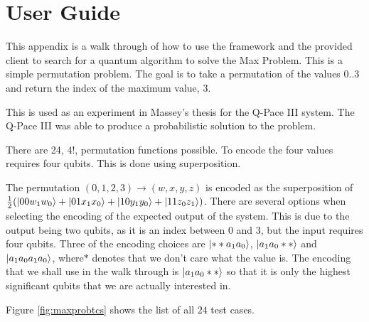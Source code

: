 \chapter{User Guide}
\label{sec:userguide}

This appendix is a walk through of how to use the framework and the provided client to search for a quantum algorithm to solve the Max Problem.
This is a simple permutation problem.
The goal is to take a permutation of the values $0..3$ and return the index of the maximum value, $3$.

This is used as an experiment in Massey's thesis\cite{masseythesis} for the Q-Pace III system.
The Q-Pace III was able to produce a probabilistic solution to the problem.

There are 24, $4!$, permutation functions possible.
To encode the four values requires four qubits.
This is done using superposition.

The permutation $(0,1,2,3)\rightarrow(w,x,y,z)$ is encoded as the superposition of $\frac{1}{2}(\left\vert{00w_1w_0}\right\rangle+\left\vert{01x_1x_0}\right\rangle+\left\vert{10y_1y_0}\right\rangle+\left\vert{11z_0z_1}\right\rangle)$.
There are several options when selecting the encoding of the expected output of the system.
This is due to the output being two qubits, as it is an index between $0$ and $3$, but the input requires four qubits.
Three of the encoding choices are $\left\vert{**a_1a_0}\right\rangle$, $\left\vert{a_1a_0**}\right\rangle$ and $\left\vert{a_1a_0a_1a_0}\right\rangle$, where$*$ denotes that we don't care what the value is.
The encoding that we shall use in the walk through is $\left\vert{a_1a_0**}\right\rangle$ so that it is only the highest significant qubits that we are actually interested in.

Figure \ref{fig:maxprobtcs} shows the list of all $24$ test cases.

